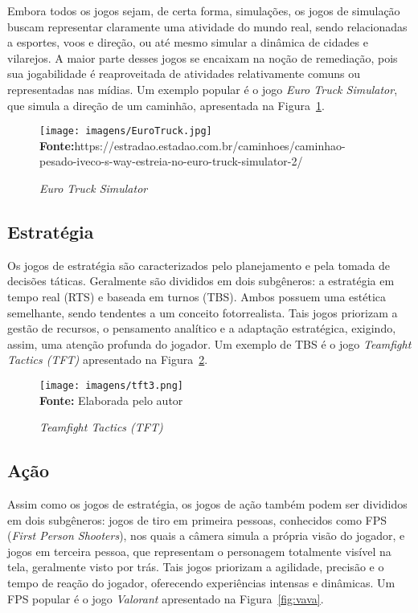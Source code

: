 Embora todos os jogos sejam, de certa forma, simulações, os jogos de simulação buscam representar claramente uma atividade do mundo real, sendo relacionadas a esportes, voos e direção, ou até mesmo simular a dinâmica de cidades e vilarejos. A maior parte desses jogos se encaixam na noção de remediação, pois sua jogabilidade é reaproveitada de atividades relativamente comuns ou representadas nas mídias. Um exemplo popular é o jogo \textit{Euro Truck Simulator}, que simula a direção de um caminhão, apresentada na Figura~\ref{fig:simulacao}.


\FloatBarrier 
\begin{figure}[!htbp]
	\centering
	\caption{\textit{Euro Truck Simulator}}
	\texttt{[image: imagens/EuroTruck.jpg]}
	\\\textbf{Fonte:}https://estradao.estadao.com.br/caminhoes/caminhao-pesado-iveco-s-way-estreia-no-euro-truck-simulator-2/ 
	
	\label{fig:simulacao}
\end{figure}
\FloatBarrier


\subsection{Estratégia}

Os jogos de estratégia são caracterizados pelo planejamento e pela tomada de decisões táticas. Geralmente são divididos em dois subgêneros: a estratégia em tempo real (RTS) e baseada em turnos (TBS). Ambos possuem uma estética semelhante, sendo tendentes a um conceito fotorrealista. Tais jogos priorizam a gestão de recursos, o pensamento analítico e a adaptação estratégica, exigindo, assim, uma atenção profunda do jogador. Um exemplo de TBS é o jogo \textit{Teamfight Tactics (TFT)} apresentado na Figura~\ref{fig:tactics}.

\FloatBarrier 
\begin{figure}[!htbp]
	\centering
	\caption{\textit{Teamfight Tactics (TFT)}}
	\texttt{[image: imagens/tft3.png]}
	\\\textbf{Fonte:} Elaborada pelo autor
	
	\label{fig:tactics}
\end{figure}
\FloatBarrier


\subsection{Ação}

Assim como os jogos de estratégia, os jogos de ação também podem ser divididos em dois subgêneros: jogos de tiro em primeira pessoas, conhecidos como FPS (\textit{First Person Shooters}), nos quais a câmera simula a própria visão do jogador, e jogos em terceira pessoa, que representam o personagem totalmente visível na tela, geralmente visto por trás. Tais jogos priorizam a agilidade, precisão e o tempo de reação do jogador, oferecendo experiências intensas e dinâmicas. Um FPS popular é o jogo \textit{Valorant} apresentado na Figura~\ref{fig:vava}.


